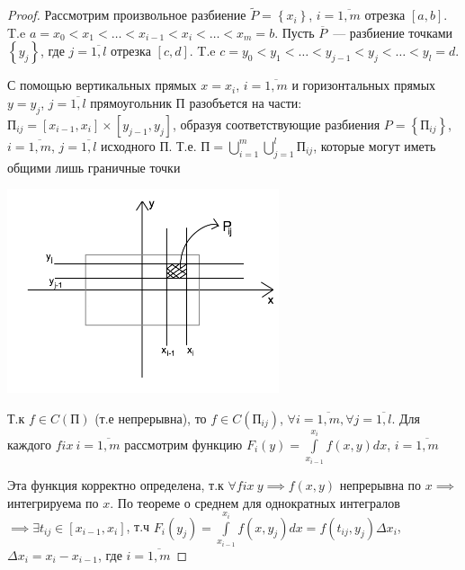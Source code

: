 \documentclass[../../main.tex]{subfiles}
\begin{document}
\begin{proof}
	Рассмотрим произвольное разбиение $ \widetilde{P} = 
	\left\lbrace x_i \right\rbrace  $, $i = \overline{1,m} $ 
	отрезка $ \left[ a, b\right]  $. T.e $a = x_0 < x_1 < \dots 
	< x_{i-1} < x_i < \dots < x_m = b $. Пусть $ \overline{P} $~--- 
	разбиение точками $ \left\lbrace y_j \right\rbrace  $, 
	 где $j = \overline{1, l} $ отрезка $ \left[ c, d\right]  $. 
	 T.e $c = y_0 < y_1 < \dots < y_{j-1} < y_j < \dots < y_l = d $.
	 
	 С помощью вертикальных прямых $ x = x_i $, $ i = \overline{1, m} $
	 и горизонтальных прямых $ y = y_j $, $ j = \overline{1, l} $
	 прямоугольник $ \text{П} $ разобъется на части: $ \text{П}_{ij} = 
	 \left[ x_{i - 1}, x_i \right] \times \left[ y_{j - 1}, y_j \right] $, 
	 образуя соответствующие разбиения 
	 $ P = \left\lbrace \text{П}_{ij} \right\rbrace $,
	 $ i = \overline{1, m} $, $ j = \overline{1, l} $ 
	 исходного $ \text{П} $. Т.е. $ \text{П} = 
	 \bigcup\limits_{i = 1}^m \bigcup\limits_{j = 1}^l \text{П}_{ij}$, 
	 которые могут иметь общими лишь граничные точки
	 
	 \begin{center}
	 	\includegraphics[width=0.6\textwidth]{lec13_rectangle.png}
	 \end{center}
 
 	Т.к $ f \in C( \text{П} )$ (т.е непрерывна), то $ f \in C( \text{П}_{ij} )$,
 	$ \forall i = \overline{1, m} , \forall j = \overline{1, l}$. Для каждого 
 	$ fix\ i = \overline{1, m} $ рассмотрим функцию $ F_i \left( y \right) = 
 	\int\limits_{ x_{i - 1} } ^ {x_i} f \left( x, y \right) dx $, 
 	$ i = \overline{1, m} $
 	
 	Эта функция корректно определена, 
 	т.к $ \forall fix\ y \implies f \left( x, y\right) $
 	непрерывна по $ x \implies $ интегрируема по $ x $. По теореме о среднем
 	для однократных интегралов $ \implies \exists t_{ij} \in 
 	\left[ x_{i - 1}, x_i \right] $, т.ч $ F_i \left( y_j \right) = 
 	\int\limits_{x_{i - 1} } ^ {x_i} f \left( x, y_j \right) dx = 
 	f \left(  t_{ij}, y_j \right) \Delta x_i$, 
 	$ \Delta x_i = x_i - x_{i - 1}$, где 
 	$ i = \overline{1, m} $
 	

\end{proof}
\end{document}
